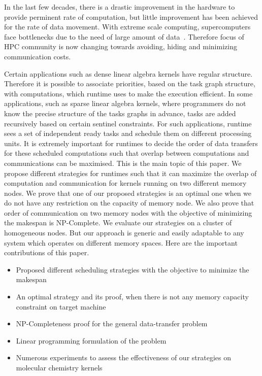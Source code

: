 \documentclass[runningheads]{llncs} %
\begin{document}
	 In the last few decades, there is a drastic improvement in the hardware to provide perminent rate of computation, but little improvement has been achieved for the rate of data movement. With extreme scale computing, supercomputers face bottlenecks due to the need of large amount of data~\cite{ascaccommitteereport2014,yelick2016}. Therefore focus of HPC community is now changing towards avoiding, hiding and minimizing communication costs.
	 
	
	Certain applications such as dense linear algebra kernels have regular structure. Therefore it is possible to associate priorities, based on the task graph structure, with computations, which runtime uses to make the execution efficient. In some applications, such as sparse linear algebra kernels, where programmers do not know the precise structure of the tasks graphs in advance,  tasks are added recursively based on certain sentinel constraints. For such applications, runtime sees a set of independent ready tasks and schedule them on different processing units. It is extremely important for runtimes to decide the order of data transfers for these scheduled computations such that overlap between computations and communications can be maximised. This is the main topic of this paper. We propose different strategies for runtimes such that it can maximize the overlap of computation and communication for kernels running on two different memory nodes. We prove that one of our proposed strategies is an optimal one when we do not have any restriction on the capacity of memory node. We also prove that order of communication on two memory nodes  with the objective of minimizing the makespan is  NP-Complete. We evaluate our strategies on a cluster of homogeneous nodes. But our approach is generic and easily adaptable to any system which operates on different memory spaces. Here are the important contributions of this paper.
	
	\renewcommand{\labelitemi}{$\bullet$}
	\begin{itemize}
		\item Proposed different scheduling strategies with the objective to minimize the makespan
		\item An optimal strategy and its proof, when there is not any memory capacity constraint on target machine
		\item NP-Completeness proof for the general data-transfer problem  
		\item Linear programming formulation of the problem
		\item Numerous  experiments to assess the effectiveness of our strategies on molecular chemistry kernels 
	\end{itemize}
		
\end{document}
